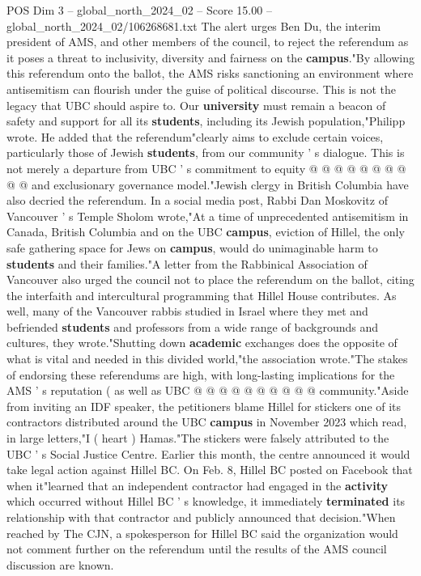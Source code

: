 \begin{textsample}{POS Dim 3 – global\_north\_2024\_02 – Score 15.00 – global\_north\_2024\_02/106268681.txt}
The alert urges Ben Du, the interim president of AMS, and other members of the council, to reject the referendum as it poses a threat to inclusivity, diversity and fairness on the \textbf{campus}."By allowing this referendum onto the ballot, the AMS risks sanctioning an environment where antisemitism can flourish under the guise of political discourse.
This is not the legacy that UBC should aspire to.
Our \textbf{university} must remain a beacon of safety and support for all its \textbf{students}, including its Jewish population,"Philipp wrote.
He added that the referendum"clearly aims to exclude certain voices, particularly those of Jewish \textbf{students}, from our community ' s dialogue.
This is not merely a departure from UBC ' s commitment to equity @ @ @ @ @ @ @ @ @ @ and exclusionary governance model."Jewish clergy in British Columbia have also decried the referendum.
In a social media post, Rabbi Dan Moskovitz of Vancouver ' s Temple Sholom wrote,"At a time of unprecedented antisemitism in Canada, British Columbia and on the UBC \textbf{campus}, eviction of Hillel, the only safe gathering space for Jews on \textbf{campus}, would do unimaginable harm to \textbf{students} and their families."A letter from the Rabbinical Association of Vancouver also urged the council not to place the referendum on the ballot, citing the interfaith and intercultural programming that Hillel House contributes.
As well, many of the Vancouver rabbis studied in Israel where they met and befriended \textbf{students} and professors from a wide range of backgrounds and cultures, they wrote."Shutting down \textbf{academic} exchanges does the opposite of what is vital and needed in this divided world,"the association wrote."The stakes of endorsing these referendums are high, with long-lasting implications for the AMS ' s reputation ( as well as UBC @ @ @ @ @ @ @ @ @ @ community."Aside from inviting an IDF speaker, the petitioners blame Hillel for stickers one of its contractors distributed around the UBC \textbf{campus} in November 2023 which read, in large letters,"I ( heart ) Hamas."The stickers were falsely attributed to the UBC ' s Social Justice Centre.
Earlier this month, the centre announced it would take legal action against Hillel BC.
On Feb. 8, Hillel BC posted on Facebook that when it"learned that an independent contractor had engaged in the \textbf{activity} which occurred without Hillel BC ' s knowledge, it immediately \textbf{terminated} its relationship with that contractor and publicly announced that decision."When reached by The CJN, a spokesperson for Hillel BC said the organization would not comment further on the referendum until the results of the AMS council discussion are known.

\end{textsample}
